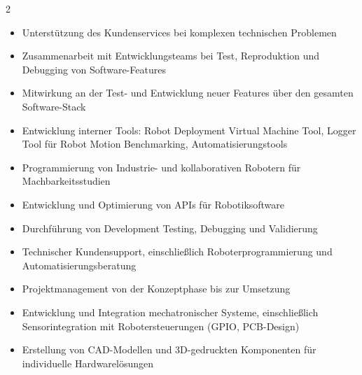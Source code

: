 \documentclass[9pt,a4paper,withhyper]{altacv}
\begin{document}

\makecvheader


\begin{paracol}{2}

    \begin{itemize}
      \item Unterstützung des Kundenservices bei komplexen technischen Problemen
      \item Zusammenarbeit mit Entwicklungsteams bei Test, Reproduktion und Debugging von Software-Features
      \item Mitwirkung an der Test- und Entwicklung neuer Features über den gesamten Software-Stack
      \item Entwicklung interner Tools: Robot Deployment Virtual Machine Tool, Logger Tool für Robot Motion Benchmarking, Automatisierungstools
  \end{itemize}

  \divider

  \begin{itemize}
      \item Programmierung von Industrie- und kollaborativen Robotern für Machbarkeitsstudien  
      \item Entwicklung und Optimierung von APIs für Robotiksoftware  
      \item Durchführung von Development Testing, Debugging und Validierung  
      \item Technischer Kundensupport, einschließlich Roboterprogrammierung und Automatisierungsberatung  
      \item Projektmanagement von der Konzeptphase bis zur Umsetzung  
      \item Entwicklung und Integration mechatronischer Systeme, einschließlich Sensorintegration mit Robotersteuerungen (GPIO, PCB-Design)  
      \item Erstellung von CAD-Modellen und 3D-gedruckten Komponenten für individuelle Hardwarelösungen  
  \end{itemize}


\end{paracol}
\end{document}
